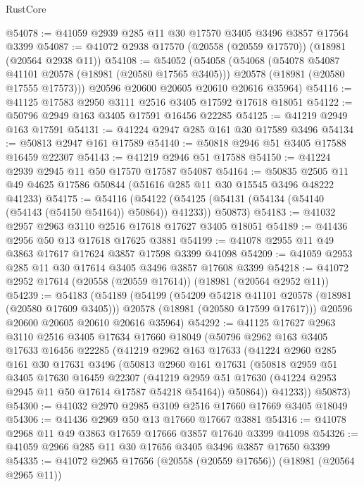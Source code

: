 \begin{lexlean}{RustCore}
\begin{coremodule}
@54078 := @41059 @2939 @285 @11 @30 @17570 @3405 @3496 @3857 @17564 @3399
@54087 := @41072 @2938 @17570 (@20558 (@20559 @17570)) (@18981 (@20564 @2938 @11))
@54108 := @54052
    (@54058
      (@54068
        (@54078 @54087 @41101 @20578 (@18981 (@20580 @17565 @3405)))
        @20578
        (@18981 (@20580 @17555 @17573)))
      @20596
      @20600
      @20605
      @20610
      @20616
      @35964)
@54116 := @41125 @17583 @2950 @3111 @2516 @3405 @17592 @17618 @18051
@54122 := @50796 @2949 @163 @3405 @17591 @16456 @22285
@54125 := @41219 @2949 @163 @17591
@54131 := @41224 @2947 @285 @161 @30 @17589 @3496
@54134 := @50813 @2947 @161 @17589
@54140 := @50818 @2946 @51 @3405 @17588 @16459 @22307
@54143 := @41219 @2946 @51 @17588
@54150 := @41224 @2939 @2945 @11 @50 @17570 @17587 @54087
@54164 := @50835 @2505 @11 @49 @4625 @17586 @50844 (@51616 @285 @11 @30 @15545 @3496 @48222 @41233)
@54175 := @54116
    (@54122 (@54125 (@54131 (@54134 (@54140 (@54143 (@54150 @54164)) @50864)) @41233)) @50873)
@54183 := @41032 @2957 @2963 @3110 @2516 @17618 @17627 @3405 @18051
@54189 := @41436 @2956 @50 @13 @17618 @17625 @3881
@54199 := @41078 @2955 @11 @49 @3863 @17617 @17624 @3857 @17598 @3399 @41098
@54209 := @41059 @2953 @285 @11 @30 @17614 @3405 @3496 @3857 @17608 @3399
@54218 := @41072 @2952 @17614 (@20558 (@20559 @17614)) (@18981 (@20564 @2952 @11))
@54239 := @54183
    (@54189
      (@54199
        (@54209 @54218 @41101 @20578 (@18981 (@20580 @17609 @3405)))
        @20578
        (@18981 (@20580 @17599 @17617)))
      @20596
      @20600
      @20605
      @20610
      @20616
      @35964)
@54292 := @41125
    @17627
    @2963
    @3110
    @2516
    @3405
    @17634
    @17660
    @18049
    (@50796
      @2962
      @163
      @3405
      @17633
      @16456
      @22285
      (@41219
        @2962
        @163
        @17633
        (@41224
          @2960
          @285
          @161
          @30
          @17631
          @3496
          (@50813
            @2960
            @161
            @17631
            (@50818
              @2959
              @51
              @3405
              @17630
              @16459
              @22307
              (@41219 @2959 @51 @17630 (@41224 @2953 @2945 @11 @50 @17614 @17587 @54218 @54164))
              @50864))
          @41233))
      @50873)
@54300 := @41032 @2970 @2985 @3109 @2516 @17660 @17669 @3405 @18049
@54306 := @41436 @2969 @50 @13 @17660 @17667 @3881
@54316 := @41078 @2968 @11 @49 @3863 @17659 @17666 @3857 @17640 @3399 @41098
@54326 := @41059 @2966 @285 @11 @30 @17656 @3405 @3496 @3857 @17650 @3399
@54335 := @41072 @2965 @17656 (@20558 (@20559 @17656)) (@18981 (@20564 @2965 @11))

\end{coremodule}
\end{lexlean}
